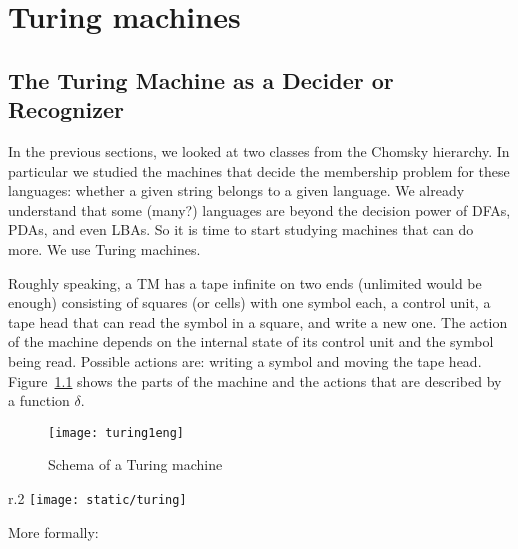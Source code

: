 \chapter{Turing machines}\label{berekenbaarheid}

\section{The Turing Machine as a Decider or Recognizer}\label{turingmachines}

In the previous sections, we looked at two classes from the Chomsky
hierarchy. In particular we studied the machines that decide the
membership problem for these languages: whether a given string belongs to
a given language. We already understand that some (many?) languages
are beyond the decision power of DFAs, PDAs, and even LBAs. So it is
time to start studying machines that can do more. We use Turing
machines.

Roughly speaking, a TM has a tape infinite on two ends (unlimited would be enough)
consisting of squares (or cells) with one symbol each, a control
unit, a tape head that can read the symbol in a square, and write a
new one. The action of the machine depends on the internal state of
its control unit and the symbol being read. Possible actions are:
writing a symbol and moving the tape head. Figure~\ref{turing1} shows
the parts of the machine and the actions that are described by a
function $\delta$.

\begin{figure}[h]
	\centering
	\texttt{[image: turing1eng]}
	\caption{Schema of a Turing machine\label{turing1}}
\end{figure}

\begin{wrapfigure}[7]{r}{.2\textwidth}
\texttt{[image: static/turing]}
\end{wrapfigure}

 More formally:

